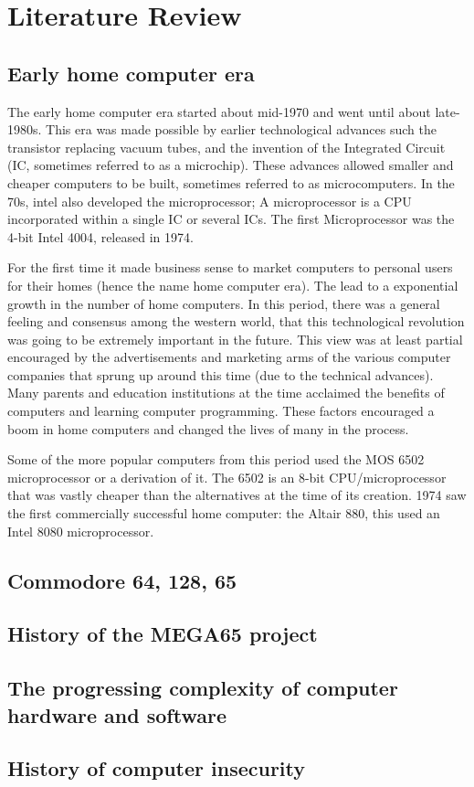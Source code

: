 \documentclass[10pt,a4paper]{report}
\begin{document}
\chapter{Literature Review}
\section{Early home computer era}
The early home computer era started about mid-1970 and went until about late-1980s. This era was made possible by earlier technological advances such the transistor replacing vacuum tubes, and the invention of the Integrated Circuit (IC, sometimes referred to as a microchip). These advances allowed smaller and cheaper computers to be built, sometimes referred to as microcomputers. In the 70s, intel also developed the microprocessor; A microprocessor is a CPU incorporated within a single IC or several ICs. The first Microprocessor was the 4-bit Intel 4004, released in 1974.

For the first time it made business sense to market computers to personal users for their homes (hence the name home computer era). The lead to a exponential growth in the number of home computers. In this period, there was a general feeling and consensus among the western world, that this technological revolution was going to be extremely important in the future. This view was at least partial encouraged by the advertisements and marketing arms of the various computer companies that sprung up around this time (due to the technical advances). Many parents and education institutions at the time acclaimed the benefits of computers and learning computer programming. These factors encouraged a boom in home computers and changed the lives of many in the process.

Some of the more popular computers from this period used the MOS 6502 microprocessor or a derivation of it. The 6502 is an 8-bit CPU/microprocessor that was vastly cheaper than the alternatives at the time of its creation. 1974 saw the first commercially successful home computer: the Altair 880, this used an Intel 8080 microprocessor. 


\section{Commodore 64, 128, 65}

\section{History of the MEGA65 project}

\section{The progressing complexity of computer hardware and software}

\section{History of computer insecurity}

  
\end{document}
